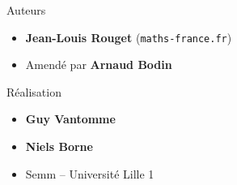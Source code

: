 \begin{frame}
\begin{minipage}{0.65\textwidth}
   \medskip
   
  Auteurs
  \begin{itemize}
  \item {\bf Jean-Louis Rouget} (\texttt{maths-france.fr})
  
  \item Amendé par {\bf Arnaud Bodin} 
  \end{itemize}
  
  \medskip

  Réalisation
  \begin{itemize}
    \item {\bf Guy Vantomme}
    \item {\bf Niels Borne} 
    \item Semm -- Université Lille 1
  \end{itemize}

  \end{minipage}  



\end{frame}


